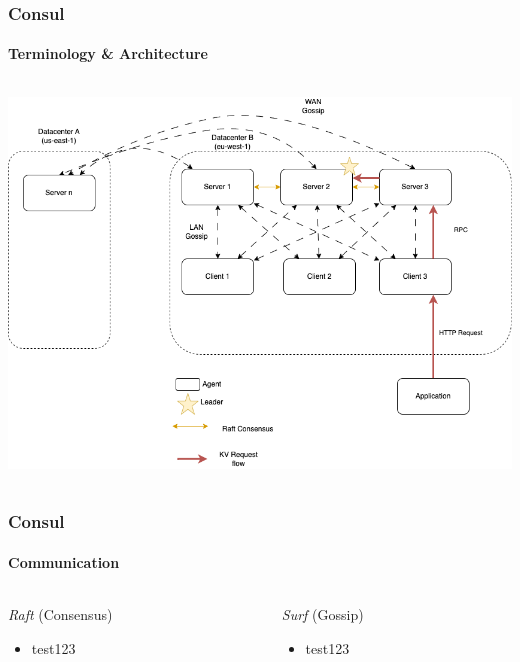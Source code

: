 \begin{frame}[shrink]
	\frametitle{Consul}
	\framesubtitle{Terminology \& Architecture}
	\begin{columns}[T]
		\begin{column}{0.7\textwidth}
			\includegraphics{assets/consul_architecture.png}
		\end{column}
	\end{columns}
\end{frame}

\begin{frame}
	\frametitle{Consul}
	\framesubtitle{Communication}
	\begin{columns}[b]
		\begin{column}{0.5\textwidth}
			\emph{Raft} (Consensus)
			\begin{itemize}
				\item test123
			\end{itemize}
		\end{column}
		\begin{column}{0.5\textwidth}
			\emph{Surf} (Gossip)
			\begin{itemize}
				\item test123
			\end{itemize}
		\end{column}
	\end{columns}
\end{frame}

